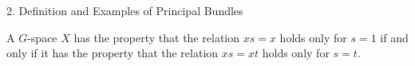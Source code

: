 2. Definition and Examples of Principal Bundles

A $G$-space $X$ has the property that the relation $xs = x$ holds only for $s = 1$ if and only if it has the property that the relation $xs = xt$ holds only for $s = t$.
